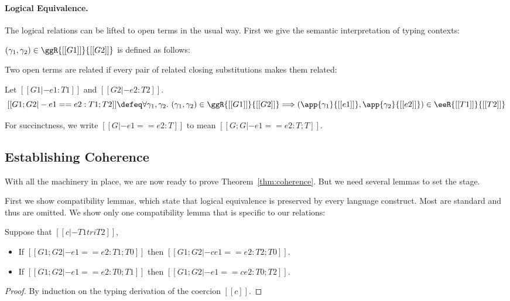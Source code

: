 \paragraph{Logical Equivalence.}
The logical relations can be lifted to open terms in the usual way. First we give the
semantic interpretation of typing contexts:
\begin{definition}
  $(\gamma_1, \gamma_2) \in \ggR{[[G1]]}{[[G2]]}$ is defined as follows:
\end{definition}
Two open terms are related if every pair of related closing substitutions
makes them related:
\begin{definition}
  Let $[[G1 |- e1 : T1]]$ and $[[G2 |- e2 : T2]]$.
  \[
    [[G1 ; G2 |- e1 == e2 : T1 ; T2]] \defeq \forall \gamma_1, \gamma_2 . \  (\gamma_1, \gamma_2) \in \ggR{[[G1]]}{[[G2]]} \Longrightarrow (\app{\gamma_1}{[[e1]]}, \app{\gamma_2}{[[e2]]}) \in \eeR{[[T1]]}{[[T2]]}
  \]
\end{definition}
For succinctness, we write $[[G |- e1 == e2 : T]]$ to mean $[[G ; G |- e1 == e2 : T ; T]]$.


\subsection{Establishing Coherence}

With all the machinery in place, we are now ready to prove Theorem~\ref{thm:coherence}. But we need
several lemmas to set the stage.

First we show compatibility lemmas, which state that logical equivalence
is preserved by every language construct. Most are standard and thus are
omitted. We show only one compatibility lemma that is specific to our relations:

\begin{lemma}   \label{lemma:co-compa}
  Suppose that $[[c |- T1 tri T2]]$,
  \begin{itemize}
  \item If $[[G1 ; G2 |- e1 == e2 : T1 ; T0]]$ then $[[G1 ; G2 |- c e1 == e2 : T2 ; T0]]$.
  \item If $[[G1 ; G2 |- e1 == e2 : T0 ; T1]]$ then $[[G1 ; G2 |- e1 == c e2 : T0 ; T2]]$.
  \end{itemize}
\end{lemma}
\begin{proof}
  By induction on the typing derivation of the coercion $[[c]]$.
\end{proof}



